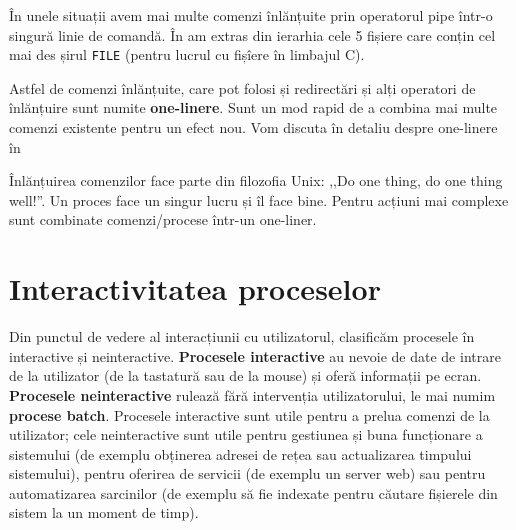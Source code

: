 În unele situații avem mai multe comenzi înlănțuite prin operatorul pipe într-o
singură linie de comandă.
În  am extras din ierarhia  cele 5 fișiere care conțin cel mai des șirul \texttt{FILE} (pentru lucrul cu fișîere în limbajul C).


Astfel de comenzi înlănțuite, care pot folosi și redirectări și alți operatori de
înlănțuire sunt numite \textbf{one-linere}. Sunt un mod rapid de a combina mai
multe comenzi existente pentru un efect nou. Vom discuta în detaliu despre one-linere în 

\begin{note}
Înlănțuirea comenzilor face parte din filozofia Unix: ,,Do one thing, do
one thing well!''. Un proces face un singur lucru și îl face bine. Pentru acțiuni
mai complexe sunt combinate comenzi/procese într-un one-liner.
\end{note}

\section{Interactivitatea proceselor}
\label{sec:process:interactivity}

Din punctul de vedere al interacțiunii cu utilizatorul, clasificăm procesele în
interactive și neinteractive. \textbf{Procesele interactive} au nevoie de date de intrare
de la utilizator (de la tastatură sau de la mouse) și oferă informații pe ecran.
\textbf{Procesele neinteractive} rulează fără intervenția utilizatorului, le mai numim \textbf{procese
batch}. Procesele interactive sunt utile pentru a prelua comenzi de la
utilizator; cele neinteractive sunt utile pentru gestiunea și buna funcționare a
sistemului (de exemplu obținerea adresei de rețea sau actualizarea timpului
sistemului), pentru oferirea de servicii (de exemplu un server web) sau pentru
automatizarea sarcinilor (de exemplu să fie indexate pentru căutare fișierele
din sistem la un moment de timp).

